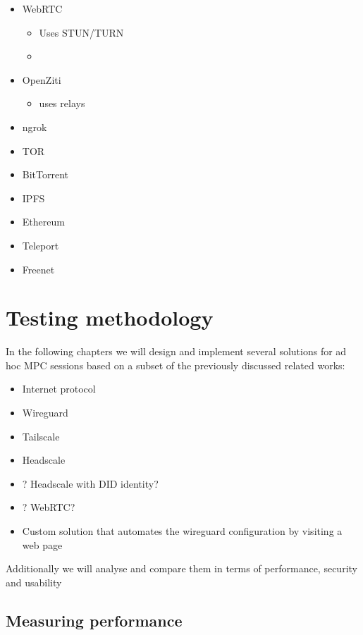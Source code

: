 \begin{itemize}
\tightlist
\item
  WebRTC

  \begin{itemize}
  \tightlist
  \item
    Uses STUN/TURN
  \item
  \end{itemize}
\item
  OpenZiti

  \begin{itemize}
  \tightlist
  \item
    uses relays
  \end{itemize}
\item
  ngrok
\item
  TOR
\item
  BitTorrent
\item
  IPFS
\item
  Ethereum
\item
  Teleport
\item
  Freenet
\end{itemize}

\hypertarget{thesis__030-methods.md}{}
\hypertarget{thesis__030-methods.md__testing-methodology}{%
\chapter{Testing
methodology}\label{thesis__030-methods.md__testing-methodology}}

In the following chapters we will design and implement several solutions
for ad hoc MPC sessions based on a subset of the previously discussed
related works:

\begin{itemize}
\tightlist
\item
  Internet protocol
\item
  Wireguard
\item
  Tailscale
\item
  Headscale
\item
  ? Headscale with DID identity?
\item
  ? WebRTC?
\item
  Custom solution that automates the wireguard configuration by visiting
  a web page
\end{itemize}

Additionally we will analyse and compare them in terms of performance,
security and usability

\hypertarget{thesis__030-methods.md__measuring-performance}{%
\section{Measuring
performance}\label{thesis__030-methods.md__measuring-performance}}

